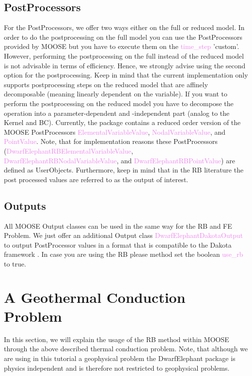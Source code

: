 \documentclass[11pt, a4paper, DIV=14]{scrartcl}
\begin{document}
\subsection{PostProcessors}
For the PostProcessors, we offer two ways either on the full or reduced model. In order to do the postprocessing on the full model you can use the PostProcessors provided by MOOSE but you have to execute them on the \textcolor{violet}{time\_step} 'custom'. However, performing the postprocessing on the full instead of the reduced model is not advisable in terms of efficiency. Hence, we strongly advise using the second option for the postprocessing. Keep in mind that the current implementation only supports postprocessing steps on the reduced model that are affinely decomposable  (meaning linearly dependent on the variable). If you want to perform the postprocessing on the reduced model you have to decompose the operation into a parameter-dependent and -independent part (analog to the Kernel and BC). Currently, the package contains a reduced order version of the MOOSE PostProcessors  \textcolor{violet}{ElementalVariableValue},  \textcolor{violet}{NodalVariableValue}, and  \textcolor{violet}{PointValue}. Note, that for implementation reasons these PostProcessors (\textcolor{violet}{DwarfElephantRBElementalVariableValue},  \textcolor{violet}{DwarfElephantRBNodalVariableValue}, and  \textcolor{violet}{DwarfElephantRBPointValue}) are defined as UserObjects. Furthermore, keep in mind that in the RB literature the post processed values are referred to as the output of interest.

\subsection{Outputs}
All MOOSE Output classes can be used in the same way for the RB and FE Problem. We just offer an additional Output class \textcolor{violet}{DwarfElephantDakotaOutput} to output PostProcessor values in a format that is compatible to the Dakota framework \cite{adams_et_al}. In case you are using the RB please method set the boolean \textcolor{violet}{use\_rb} to true.

\section{A Geothermal Conduction Problem} \label{Thermal Conduction_DE}
In this section, we will explain the usage of the RB method within MOOSE through the above described thermal conduction problem. Note, that although we are using in this tutorial a geophysical problem the DwarfElephant package is physics independent and is therefore not restricted to geophysical problems. 
\end{document}
